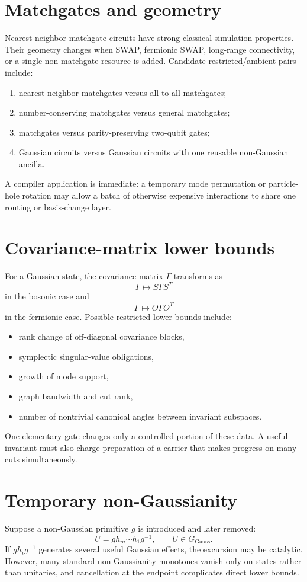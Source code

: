\section{Matchgates and geometry}
Nearest-neighbor matchgate circuits \cite{Valiant2002,JozsaMiyake2008} have strong classical simulation properties.  Their geometry changes when SWAP, fermionic SWAP, long-range connectivity, or a single non-matchgate resource is added.  Candidate restricted/ambient pairs include:
\begin{enumerate}
\item nearest-neighbor matchgates versus all-to-all matchgates;
\item number-conserving matchgates versus general matchgates;
\item matchgates versus parity-preserving two-qubit gates;
\item Gaussian circuits versus Gaussian circuits with one reusable non-Gaussian ancilla.
\end{enumerate}

A compiler application is immediate: a temporary mode permutation or particle-hole rotation may allow a batch of otherwise expensive interactions to share one routing or basis-change layer.

\section{Covariance-matrix lower bounds}
For a Gaussian state, the covariance matrix $\Gamma$ transforms as
\[
\Gamma\longmapsto S\Gamma S^T
\]
in the bosonic case and
\[
\Gamma\longmapsto O\Gamma O^T
\]
in the fermionic case.  Possible restricted lower bounds include:
\begin{itemize}
\item rank change of off-diagonal covariance blocks,
\item symplectic singular-value obligations,
\item growth of mode support,
\item graph bandwidth and cut rank,
\item number of nontrivial canonical angles between invariant subspaces.
\end{itemize}
One elementary gate changes only a controlled portion of these data.  A useful invariant must also charge preparation of a carrier that makes progress on many cuts simultaneously.

\section{Temporary non-Gaussianity}
Suppose a non-Gaussian primitive $g$ is introduced and later removed:
\[
U=g h_m\cdots h_1 g^{-1},
\qquad U\in G_{\mathrm{Gauss}}.
\]
If $g h_i g^{-1}$ generates several useful Gaussian effects, the excursion may be catalytic.  However, many standard non-Gaussianity monotones vanish only on states rather than unitaries, and cancellation at the endpoint complicates direct lower bounds.

